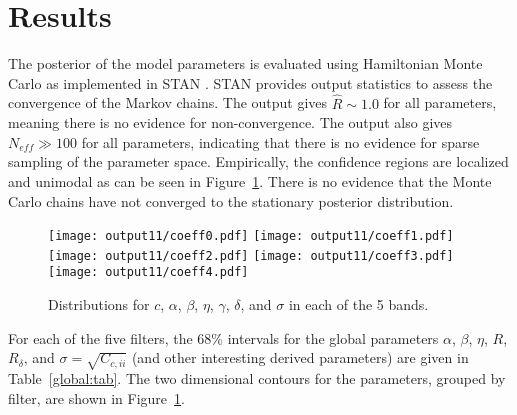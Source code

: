 \documentclass{aastex}   	%
\begin{document}
\section{Results}
\label{results:sec}
The posterior of the model parameters is evaluated using Hamiltonian Monte Carlo as implemented in
STAN \citep{stan}. STAN provides output statistics to assess
the convergence of the Markov chains.  The output gives $\hat{R} \sim 1.0$ for all parameters, meaning there is no evidence for non-convergence.  The
output also gives  $N_{eff} \gg 100$ for all parameters, indicating that there is no evidence for sparse sampling of the parameter space.
Empirically, the confidence regions are localized and unimodal as can be seen in  Figure~\ref{global:fig}.  There is no evidence that
the Monte Carlo chains have not converged to the stationary posterior distribution.

\begin{figure}[htbp] %
   \centering
   \texttt{[image: output11/coeff0.pdf]} 
   \texttt{[image: output11/coeff1.pdf]} 
   \texttt{[image: output11/coeff2.pdf]} 
      \texttt{[image: output11/coeff3.pdf]} 
         \texttt{[image: output11/coeff4.pdf]} 
            \caption{Distributions for $c$, $\alpha$, $\beta$, $\eta$, $\gamma$, $\delta$, and $\sigma$ in each of the 5 bands.   \label{global:fig}}
\end{figure}


For each of the five filters, the 68\% intervals for the global parameters $\alpha$, $\beta$, $\eta$, $R$, $R_\delta$, and $\sigma = \sqrt{C_{c,ii}}$
(and other interesting derived parameters)
are given in Table~\ref{global:tab}.
The two dimensional contours for the parameters, grouped by filter, are shown in Figure~\ref{global:fig}.
\end{document}
